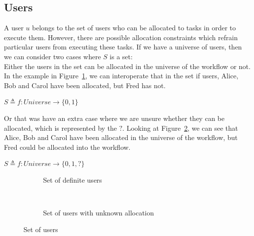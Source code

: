\documentclass[a4paper]{report}
\begin{document}
\subsection{Users}
A user $u$ belongs to the set of users who can be allocated to tasks in order to execute them. However, there are possible allocation constraints which refrain particular users from executing these tasks. If we have a universe of users, then we can consider two cases where $S$ is a set:\\
Either the users in the set can be allocated in the universe of the workflow or not. In the example in Figure~\ref{fig:Set of definite users}, we can interoperate that in the set if users, Alice, Bob and Carol have been allocated, but Fred has not.
\begin{center}
$ S \triangleq f : Universe \longrightarrow \{0, 1\}$
\end{center}
Or that was have an extra case where we are unsure whether they can be allocated, which is represented by the $?$. Looking at Figure~\ref{fig:Set of users with unknown allocation}, we can see that Alice, Bob and Carol have been allocated in the universe of the workflow, but Fred could be allocated into the workflow. 
\begin{center}
$ S \triangleq f : Universe \longrightarrow \{0, 1, ?\}$
\end{center}

\begin{figure}[!h]
\centering
\begin{subfigure}[b]{\textwidth}
\centering
{}
\caption{Set of definite users}
\label{fig:Set of definite users}
\end{subfigure} \\
\begin{subfigure}[b]{\textwidth}
\centering
{}
\caption{Set of users with unknown allocation}
\label{fig:Set of users with unknown allocation}
\end{subfigure}
\caption{Set of users}
\label{fig:Set of Users}
\end{figure}
\end{document}
